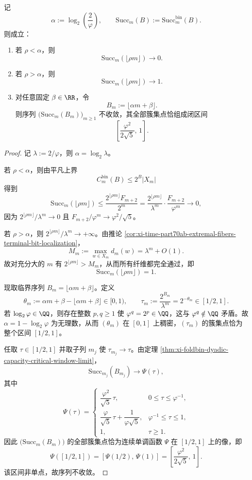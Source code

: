 \begin{theorem}[均匀微态输入下的临界比特率相变与簇集区间]\label{thm:xi-time-part70d-critical-bitrate-phase-cluster}
记
\[
\alpha:=\log_2\!\left(\frac{2}{\varphi}\right),
\qquad
\mathrm{Succ}_m(B):=\mathrm{Succ}_m^{\mathrm{bin}}(B).
\]
则成立：
\begin{enumerate}
  \item 若 \(\rho<\alpha\)，则
  \[
  \mathrm{Succ}_m(\lfloor \rho m\rfloor)\longrightarrow 0.
  \]
  \item 若 \(\rho>\alpha\)，则
  \[
  \mathrm{Succ}_m(\lfloor \rho m\rfloor)\longrightarrow 1.
  \]
  \item 对任意固定 \(\beta\in\RR\)，令
  \[
  B_m:=\lfloor \alpha m+\beta\rfloor.
  \]
  则序列 \(\bigl(\mathrm{Succ}_m(B_m)\bigr)_{m\ge 1}\) 不收敛，其全部簇集点恰组成闭区间
  \[
  \left[\frac{\varphi^2}{2\sqrt5},\,1\right].
  \]
\end{enumerate}
\end{theorem}
\begin{proof}
记 \(\lambda:=2/\varphi\)，则 \(\alpha=\log_2\lambda\)。

若 \(\rho<\alpha\)，则由平凡上界
\[
C_m^{\mathrm{bin}}(B)\le 2^B|X_m|
\]
得到
\[
\mathrm{Succ}_m(\lfloor \rho m\rfloor)
\le
\frac{2^{\lfloor \rho m\rfloor}F_{m+2}}{2^m}
=
\frac{2^{\lfloor \rho m\rfloor}}{\lambda^m}\cdot \frac{F_{m+2}}{\varphi^m}
\longrightarrow 0,
\]
因为 \(2^{\lfloor \rho m\rfloor}/\lambda^m\to 0\) 且 \(F_{m+2}/\varphi^m\to \varphi^2/\sqrt5\)。

若 \(\rho>\alpha\)，则 \(2^{\lfloor \rho m\rfloor}/\lambda^m\to+\infty\)。由推论 \ref{cor:xi-time-part70ab-extremal-fibers-terminal-bit-localization}，
\[
M_m:=\max_{w\in X_m}d_m(w)=\lambda^m+O(1).
\]
故对充分大的 \(m\) 有 \(2^{\lfloor \rho m\rfloor}>M_m\)，从而所有纤维都完全通过，即
\[
\mathrm{Succ}_m(\lfloor \rho m\rfloor)=1.
\]

现取临界序列 \(B_m=\lfloor \alpha m+\beta\rfloor\)。定义
\[
\theta_m:=\alpha m+\beta-\lfloor \alpha m+\beta\rfloor\in[0,1),
\qquad
\tau_m:=\frac{2^{B_m}}{\lambda^m}=2^{-\theta_m}\in[1/2,1].
\]
若 \(\log_2\varphi\in\QQ\)，则存在整数 \(p,q\ge 1\) 使 \(\varphi^q=2^p\in\QQ\)，这与 \(\varphi^q\notin\QQ\) 矛盾。故 \(\alpha=1-\log_2\varphi\) 为无理数，从而 \((\theta_m)\) 在 \([0,1]\) 上稠密，\((\tau_m)\) 的簇集点恰为整个区间 \([1/2,1]\)。

任取 \(\tau\in[1/2,1]\) 并取子列 \(m_j\) 使 \(\tau_{m_j}\to\tau\)。由定理 \ref{thm:xi-foldbin-dyadic-capacity-critical-window-limit}，
\[
\mathrm{Succ}_{m_j}(B_{m_j})
\longrightarrow
\Psi(\tau),
\]
其中
\[
\Psi(\tau)=
\begin{cases}
\dfrac{\varphi^2}{\sqrt5}\,\tau, & 0\le \tau\le \varphi^{-1},\\[6pt]
\dfrac{\varphi}{\sqrt5}\,\tau+\dfrac{1}{\varphi\sqrt5}, & \varphi^{-1}\le \tau\le 1,\\[8pt]
1, & \tau\ge 1.
\end{cases}
\]
因此 \(\bigl(\mathrm{Succ}_m(B_m)\bigr)\) 的全部簇集点恰为连续单调函数 \(\Psi\) 在 \([1/2,1]\) 上的像，即
\[
\Psi([1/2,1])
=
\left[\Psi(1/2),\,\Psi(1)\right]
=
\left[\frac{\varphi^2}{2\sqrt5},\,1\right].
\]
该区间非单点，故序列不收敛。
\end{proof}

